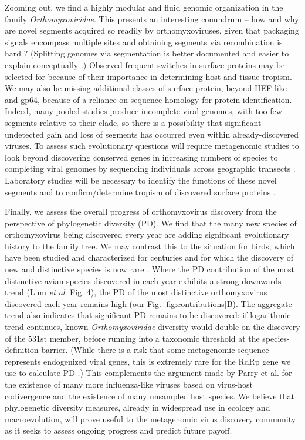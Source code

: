 \documentclass[11pt,twocolumn]{article}
\begin{document}
Zooming out, we find a highly modular and fluid genomic organization in the family \textit{Orthomyxoviridae}. This presents an interesting conundrum -- how and why are novel segments acquired so readily by orthomyxoviruses, given that packaging signals encompass multiple sites \citep{baker_influenza_2014} and obtaining segments via recombination is hard \citep{chare_phylogenetic_2003}? (Splitting genomes via segmentation is better documented \citep{kondo_orchid_2006,qin_tick-borne_2014} and easier to explain conceptually \citep{ke_phylodynamic_2013}.) Observed frequent switches in surface proteins may be selected for because of their importance in determining host and tissue tropism. We may also be missing additional classes of surface protein, beyond HEF-like and gp64, because of a reliance on sequence homology for protein identification. Indeed, many pooled studies produce incomplete viral genomes, with too few segments relative to their clade, so there is a possibility that significant undetected gain and loss of segments has occurred even within already-discovered viruses. To assess such evolutionary questions will require metagenomic studies to look beyond discovering conserved genes in increasing numbers of species to completing viral genomes by sequencing individuals across geographic transects \citep{batson_single_2021}. Laboratory studies will be necessary to identify the functions of these novel segments and to confirm/determine tropism of discovered surface proteins \citep{arunkumar_functionality_2021}.

Finally, we assess the overall progress of orthomyxovirus discovery from the perspective of phylogenetic diversity (PD). We find that the many new species of orthomyxovirus being discovered every year are adding significant evolutionary history to the family tree. We may contrast this to the situation for birds, which have been studied and characterized for centuries and for which the discovery of new and distinctive species is now rare \citep{lum_tracking_2022}. Where the PD contribution of the most distinctive avian species discovered in each year exhibits a strong downwards trend (Lum \textit{et al}.\citep{lum_tracking_2022} Fig. 4), the PD of the most distinctive orthomyxovirus discovered each year remains high (our Fig. \ref{fig:contributions}B). The aggregate trend also indicates that significant PD remains to be discovered: if logarithmic trend continues, known \textit{Orthomyxoviridae} diversity would double on the discovery of the 531st member, before running into a taxonomic threshold at the species-definition barrier. (While there is a risk that some metagenomic sequence represents endogenized viral genes, this is extremely rare for the RdRp gene we use to calculate PD \citep{whitfield_diversity_2017}.)
This complements the argument made by Parry et al.\citep{parry_divergent_2020} for the existence of many more influenza-like viruses based on virus-host codivergence and the existence of many unsampled host species.
We believe that phylogenetic diversity measures, already in widespread use in ecology and macroevolution, will prove useful to the metagenomic virus discovery community as it seeks to assess ongoing progress and predict future payoff.
\end{document}

